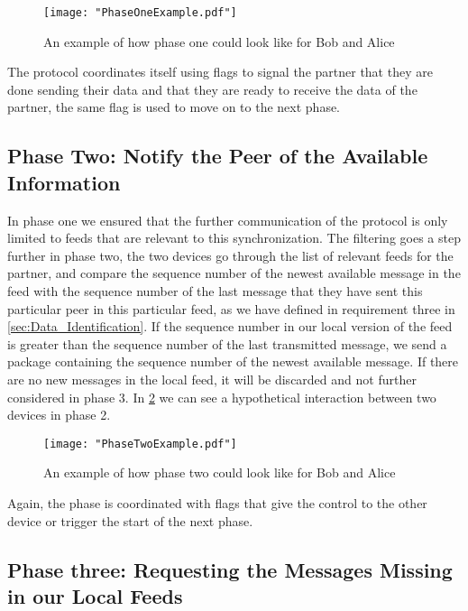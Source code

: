 \begin{figure}[!h]
	\centering
	\texttt{[image: "PhaseOneExample.pdf"]}
	\caption{An example of how phase one could look like for Bob and Alice}
	\label{fig:PhaseOneExample}
\end{figure}

The protocol coordinates itself using flags to signal the partner that they are done sending their data and that they are ready to receive the data of the partner, the same flag is used to move on to the next phase.

\subsection{Phase Two: Notify the Peer of the Available Information}
\label{sec:phaseTwo}
In phase one we ensured that the further communication of the protocol is only limited to feeds that are relevant to this synchronization. The filtering goes a step further in phase two, the two devices go through the list of relevant feeds for the partner, and compare the sequence number of the newest available message in the feed with the sequence number of the last message that they have sent this particular peer in this particular feed, as we have defined in requirement three in \ref{sec:Data_Identification}. If the sequence number in our local version of the feed is greater than the sequence number of the last transmitted message, we send a package containing the sequence number of the newest available message. If there are no new messages in the local feed, it will be discarded and not further considered in phase 3. In \ref{fig:PhaseTwoExample} we can see a hypothetical interaction between two devices in phase 2.

\begin{figure}[!h]
	\centering
	\texttt{[image: "PhaseTwoExample.pdf"]}
	\caption{An example of how phase two could look like for Bob and Alice}
	\label{fig:PhaseTwoExample}
\end{figure}

Again, the phase is coordinated with flags that give the control to the other device or trigger the start of the next phase.

\subsection{Phase three: Requesting the Messages Missing in our Local Feeds}

